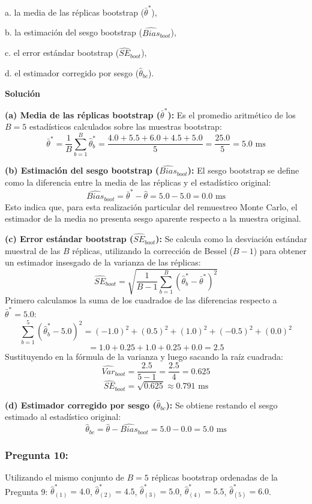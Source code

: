 \documentclass[a4paper]{article}
\begin{document}
a. la media de las réplicas bootstrap ($\bar{\theta}^*$), 

b. la estimación del sesgo bootstrap ($\widehat{Bias}_{boot}$), 

c. el error estándar bootstrap ($\widehat{SE}_{boot}$),

d. el estimador corregido por sesgo ($\hat{\theta}_{bc}$).

\textbf{Solución}

\textbf{(a) Media de las réplicas bootstrap ($\bar{\theta}^*$):}
Es el promedio aritmético de los $B=5$ estadísticos calculados sobre las muestras bootstrap:
$$ \bar{\theta}^* = \frac{1}{B} \sum_{b=1}^B \hat{\theta}^*_b = \frac{4.0 + 5.5 + 6.0 + 4.5 + 5.0}{5} = \frac{25.0}{5} = 5.0 \text{ ms} $$

\textbf{(b) Estimación del sesgo bootstrap ($\widehat{Bias}_{boot}$):}
El sesgo bootstrap se define como la diferencia entre la media de las réplicas y el estadístico original:
$$ \widehat{Bias}_{boot} = \bar{\theta}^* - \hat{\theta} = 5.0 - 5.0 = 0.0 \text{ ms} $$
Esto indica que, para esta realización particular del remuestreo Monte Carlo, el estimador de la media no presenta sesgo aparente respecto a la muestra original.

\textbf{(c) Error estándar bootstrap ($\widehat{SE}_{boot}$):}
Se calcula como la desviación estándar muestral de las $B$ réplicas, utilizando la corrección de Bessel ($B-1$) para obtener un estimador insesgado de la varianza de las réplicas:
$$ \widehat{SE}_{boot} = \sqrt{\frac{1}{B-1} \sum_{b=1}^B (\hat{\theta}^*_b - \bar{\theta}^*)^2} $$
Primero calculamos la suma de los cuadrados de las diferencias respecto a $\bar{\theta}^* = 5.0$:
$$ \sum_{b=1}^5 (\hat{\theta}^*_b - 5.0)^2 = (-1.0)^2 + (0.5)^2 + (1.0)^2 + (-0.5)^2 + (0.0)^2 $$
$$ = 1.0 + 0.25 + 1.0 + 0.25 + 0.0 = 2.5 $$
Sustituyendo en la fórmula de la varianza y luego sacando la raíz cuadrada:
$$ \widehat{Var}_{boot} = \frac{2.5}{5-1} = \frac{2.5}{4} = 0.625 $$
$$ \widehat{SE}_{boot} = \sqrt{0.625} \approx 0.791 \text{ ms} $$

\textbf{(d) Estimador corregido por sesgo ($\hat{\theta}_{bc}$):}
Se obtiene restando el sesgo estimado al estadístico original:
$$ \hat{\theta}_{bc} = \hat{\theta} - \widehat{Bias}_{boot} = 5.0 - 0.0 = 5.0 \text{ ms} $$

\subsubsection{Pregunta 10:} Utilizando el mismo conjunto de $B=5$ réplicas bootstrap ordenadas de la Pregunta 9: $\hat{\theta}^*_{(1)}=4.0$, $\hat{\theta}^*_{(2)}=4.5$, $\hat{\theta}^*_{(3)}=5.0$, $\hat{\theta}^*_{(4)}=5.5$, $\hat{\theta}^*_{(5)}=6.0$.
\end{document}
